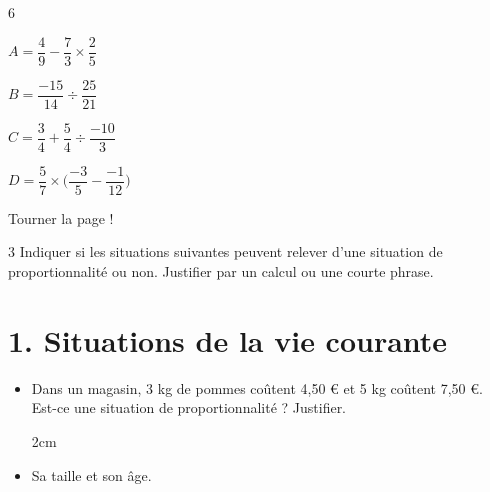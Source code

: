\documentclass[a4paper]{book}
\begin{document}
{\begin{exerciceNote}{6}
        \medskip

        \begin{minipage}{0.24\linewidth}
            $A = \dfrac{4}{9} - \dfrac{7}{3} \times \dfrac{2}{5}$
            \vspace{7cm}
        \end{minipage}
        \hfill\vline\hfill
        \begin{minipage}{0.24\linewidth}
            $B = \dfrac{-15}{14} \div \dfrac{25}{21}$
            \vspace{7cm}
        \end{minipage}        
        \hfill\vline\hfill
        \begin{minipage}{0.24\linewidth}
            $C = \dfrac{3}{4} + \dfrac{5}{4} \div \dfrac{-10}{3}$
            \vspace{7cm}
        \end{minipage}
        \hfill\vline\hfill
        \begin{minipage}{0.24\linewidth}
            $D = \dfrac{5}{7}\times\bigg(\dfrac{-3}{5}-\dfrac{-1}{12}\bigg)$
            \vspace{7cm}
        \end{minipage}     
    \end{exerciceNote}
    
\vfill
\hfill Tourner la page !

\newpage


    \begin{exerciceNote}{3}        
        Indiquer si les situations suivantes peuvent relever d'une situation de proportionnalité ou non. Justifier par un calcul ou une courte phrase.


        \section*{1. Situations de la vie courante}

        \begin{itemize}[leftmargin=*]
            \item Dans un magasin, 3 kg de pommes coûtent 4,50 € et 5 kg coûtent 7,50 €. Est-ce une situation de proportionnalité ? Justifier.

            \medskip
            \begin{ZoneReponse}{2cm}                
            \end{ZoneReponse}

            \item Sa taille  et son âge. 


\end{itemize}
\end{exerciceNote}}
\end{document}

